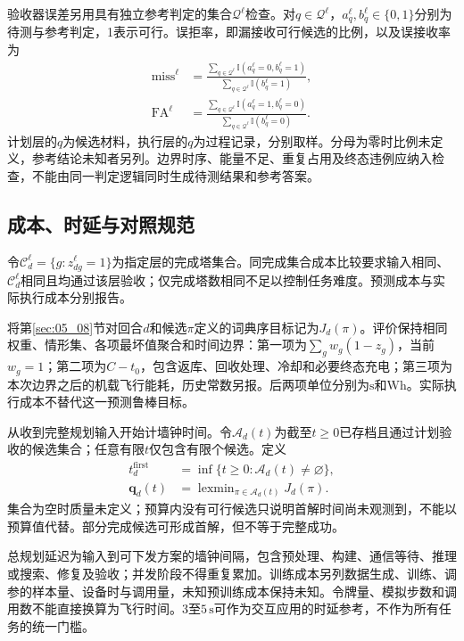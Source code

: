 验收器误差另用具有独立参考判定的集合$\mathcal Q^\ell$检查。对$q\in\mathcal Q^\ell$，$a_q^\ell,b_q^\ell\in\{0,1\}$分别为待测与参考判定，1表示可行。误拒率，即漏接收可行候选的比例，以及误接收率为
\begin{align}
 \mathrm{miss}^{\ell}&=
 \frac{\sum_{q\in\mathcal Q^\ell}\mathbb I(a_q^\ell=0,b_q^\ell=1)}
 {\sum_{q\in\mathcal Q^\ell}\mathbb I(b_q^\ell=1)},
 \label{s0701:miss}\\
 \mathrm{FA}^{\ell}&=
 \frac{\sum_{q\in\mathcal Q^\ell}\mathbb I(a_q^\ell=1,b_q^\ell=0)}
 {\sum_{q\in\mathcal Q^\ell}\mathbb I(b_q^\ell=0)}.
 \label{s0701:falseaccept}
\end{align}
计划层的$q$为候选材料，执行层的$q$为过程记录，分别取样。分母为零时比例未定义，参考结论未知者另列。边界时序、能量不足、重复占用及终态违例应纳入检查，不能由同一判定逻辑同时生成待测结果和参考答案。

\subsection{成本、时延与对照规范}

令$\mathcal C_d^\ell=\{g:z_{dg}^\ell=1\}$为指定层的完成塔集合。同完成集合成本比较要求输入相同、$\mathcal C_d^\ell$相同且均通过该层验收；仅完成塔数相同不足以控制任务难度。预测成本与实际执行成本分别报告。

将第\ref{sec:05_08}节对回合$d$和候选$\pi$定义的词典序目标记为$J_d(\pi)$。评价保持相同权重、情形集、各项最坏值聚合和时间边界：第一项为$\sum_g w_g(1-z_g)$，当前$w_g=1$；第二项为$C-t_0$，包含返库、回收处理、冷却和必要终态充电；第三项为本次边界之后的机载飞行能耗，历史常数另报。后两项单位分别为$\mathrm{s}$和$\mathrm{Wh}$。实际执行成本不替代这一预测鲁棒目标。

从收到完整规划输入开始计墙钟时间。令$\mathcal A_d(t)$为截至$t\geq0$已存档且通过计划验收的候选集合；任意有限$t$仅包含有限个候选。定义
\begin{align}
 t_d^{\mathrm{first}}&=\inf\{t\geq0:\mathcal A_d(t)\ne\varnothing\},
 \label{s0701:first}\\
 \mathbf q_d(t)&=\operatorname{lexmin}_{\pi\in\mathcal A_d(t)}J_d(\pi).
 \label{s0701:anytime}
\end{align}
集合为空时质量未定义；预算内没有可行候选只说明首解时间尚未观测到，不能以预算值代替。部分完成候选可形成首解，但不等于完整成功。

总规划延迟为输入到可下发方案的墙钟间隔，包含预处理、构建、通信等待、推理或搜索、修复及验收；并发阶段不得重复累加。训练成本另列数据生成、训练、调参的样本量、设备时与调用量，未知预训练成本保持未知。令牌量、模拟步数和调用数不能直接换算为飞行时间。$3$至$5\,\mathrm{s}$可作为交互应用的时延参考，不作为所有任务的统一门槛。

